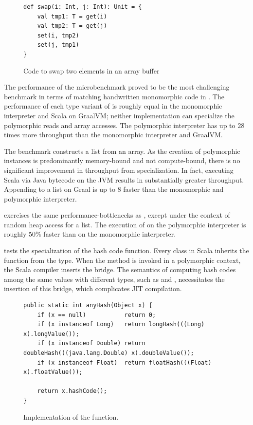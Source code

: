 \begin{figure}[!htb]
\begin{verbatim}
def swap(i: Int, j: Int): Unit = {
	val tmp1: T = get(i)
	val tmp2: T = get(j)
	set(i, tmp2)
	set(j, tmp1)
}
\end{verbatim}
\caption{Code to swap two elements in an array buffer}
\label{impl:swap}
\end{figure}

The performance of the  microbenchmark proved to be the most challenging benchmark in terms of matching handwritten monomorphic code in \cite{scala:miniboxing}.
The performance of each type variant of  is roughly equal in the monomorphic interpreter and Scala on GraalVM; neither implementation can specialize the polymorphic reads and array accesses.
The polymorphic interpreter has up to $28$ times more throughput than the monomorphic interpreter and GraalVM.

The  benchmark constructs a list from an array.
As the creation of polymorphic instances is predominantly memory-bound and not compute-bound, there is no significant improvement in throughput from specialization.
In fact, executing Scala via Java bytecode on the JVM results in substantially greater throughput.
Appending to a list on Graal is up to $8$ faster than the monomorphic and polymorphic interpreter.

 exercises the same performance-bottlenecks as , except under the context of random heap access for a list.
The execution of  on the polymorphic interpreter is roughly $50\%$ faster than on the monomorphic interpreter.

 tests the specialization of the hash code function.
Every class in Scala inherits the  function from the  type.
When the  method is invoked in a polymorphic context, the Scala compiler inserts the  bridge.
The semantics of computing hash codes among the same values with different types, such as  and , necessitates the insertion of this bridge, which complicates JIT compilation.

\begin{figure}[!htb]
\begin{verbatim}
public static int anyHash(Object x) {
	if (x == null)           return 0;
	if (x instanceof Long)   return longHash(((Long) x).longValue());
	if (x instanceof Double) return doubleHash(((java.lang.Double) x).doubleValue());
	if (x instanceof Float)  return floatHash(((Float) x).floatValue());
	
	return x.hashCode();
}
\end{verbatim}
\caption{Implementation of the  function.}
\label{impl:anyHash}
\end{figure}

